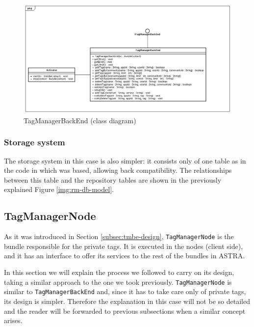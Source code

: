 \begin{figure}[h!]
 \begin{center}
 \includegraphics[scale=0.4]{diagrams/TagManagerBackEndClassDiagram.png}
  \caption{\label{img:tmbe-cd}TagManagerBackEnd (class diagram)}
 \end{center}
\end{figure}

\subsubsection{Storage system}
\label{subsubsec:tmbe-storage-system}
The storage system in this case is also simpler: it consists only of one
table as in the code in which was based, allowing back compatibility. 
\newline
The relationships between this table and the repository tables are shown in the
previously explained Figure \ref{img:rm-db-model}.


\subsection{TagManagerNode}
\label{subsec:tmn-design}

As it was introduced in Section \ref{subsec:tmbe-design}, \verb|TagManagerNode|
is the bundle responsible for the private tags. It is executed in the nodes 
(client side), and it has an interface to offer its services to the rest of 
the bundles in ASTRA.
\newline

In this section we will explain the process we followed to carry on its design, 
taking a similar approach to the one we took previously. \verb|TagManagerNode|
is similar to \verb|TagManagerBackEnd| and, since it has to take care only of
private tags, its design is simpler. Therefore the explanation in this case
will not be so detailed and the reader will be forwarded to previous
subsections when a similar concept arises.


